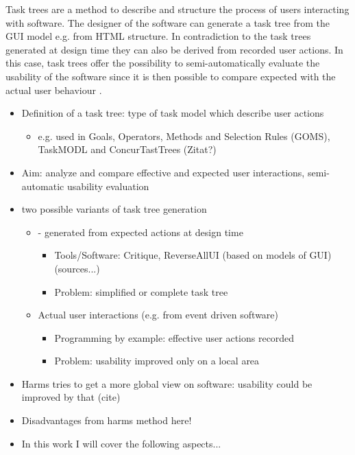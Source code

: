 
Task trees are a method to describe and structure the process of users interacting with software. 
The designer of the software can generate a task tree from the GUI model e.g. from HTML structure. In contradiction to the task trees generated at design time they can also be derived from recorded user actions. In this case, task trees offer the possibility to semi-automatically evaluate the usability of the software since it is then possible to compare expected with the actual user behaviour \citep{harms2013}.  

\begin{itemize}
	\item Definition of a task tree: type of task model which describe user actions
    	\begin{itemize}
		\item  e.g. used in Goals, Operators, Methods and Selection Rules (GOMS), TaskMODL and ConcurTastTrees (Zitat?)
	\end{itemize}
	\item Aim: analyze and compare effective and expected user interactions, semi-automatic usability evaluation
	\item two possible variants of task tree generation 
 	\begin{itemize}
		\item - generated from expected actions at design time
      		\begin{itemize}
			\item Tools/Software: Critique, ReverseAllUI (based on models of GUI) (sources...)
     			\item Problem: simplified or complete task tree
		\end{itemize}
		\item Actual user interactions (e.g. from event driven software)
     		\begin{itemize} 
			\item Programming by example: effective user actions recorded
			\item Problem: usability improved only on a local area
		\end{itemize}
	\end{itemize}
	\item Harms tries to get a more global view on software: usability could be improved by that (cite) 
	\item Disadvantages from harms method here!
	\item In this work I will cover the following aspects...
\end{itemize}
